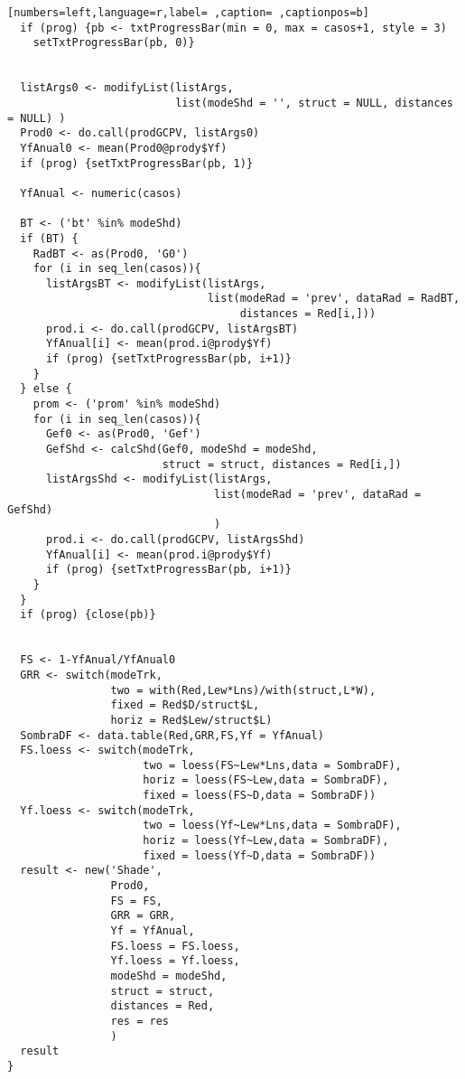 \begin{lstlisting}[numbers=left,language=r,label= ,caption= ,captionpos=b]
  if (prog) {pb <- txtProgressBar(min = 0, max = casos+1, style = 3)
    setTxtProgressBar(pb, 0)}
  
  
  listArgs0 <- modifyList(listArgs,
                          list(modeShd = '', struct = NULL, distances = NULL) )
  Prod0 <- do.call(prodGCPV, listArgs0)
  YfAnual0 <- mean(Prod0@prody$Yf) 
  if (prog) {setTxtProgressBar(pb, 1)}
  
  YfAnual <- numeric(casos) 
  
  BT <- ('bt' %in% modeShd)
  if (BT) { 
    RadBT <- as(Prod0, 'G0')
    for (i in seq_len(casos)){
      listArgsBT <- modifyList(listArgs,
                               list(modeRad = 'prev', dataRad = RadBT,
                                    distances = Red[i,]))
      prod.i <- do.call(prodGCPV, listArgsBT)
      YfAnual[i] <- mean(prod.i@prody$Yf)
      if (prog) {setTxtProgressBar(pb, i+1)}
    }
  } else {
    prom <- ('prom' %in% modeShd)
    for (i in seq_len(casos)){
      Gef0 <- as(Prod0, 'Gef')
      GefShd <- calcShd(Gef0, modeShd = modeShd,
                        struct = struct, distances = Red[i,])
      listArgsShd <- modifyList(listArgs,
                                list(modeRad = 'prev', dataRad = GefShd)
                                )
      prod.i <- do.call(prodGCPV, listArgsShd)
      YfAnual[i] <- mean(prod.i@prody$Yf)
      if (prog) {setTxtProgressBar(pb, i+1)}
    }
  }
  if (prog) {close(pb)}
  

  FS <- 1-YfAnual/YfAnual0
  GRR <- switch(modeTrk,
                two = with(Red,Lew*Lns)/with(struct,L*W),
                fixed = Red$D/struct$L,
                horiz = Red$Lew/struct$L)
  SombraDF <- data.table(Red,GRR,FS,Yf = YfAnual)
  FS.loess <- switch(modeTrk,
                     two = loess(FS~Lew*Lns,data = SombraDF),
                     horiz = loess(FS~Lew,data = SombraDF),
                     fixed = loess(FS~D,data = SombraDF))
  Yf.loess <- switch(modeTrk,
                     two = loess(Yf~Lew*Lns,data = SombraDF),
                     horiz = loess(Yf~Lew,data = SombraDF),
                     fixed = loess(Yf~D,data = SombraDF))
  result <- new('Shade',
                Prod0, 
                FS = FS,
                GRR = GRR,
                Yf = YfAnual,
                FS.loess = FS.loess,
                Yf.loess = Yf.loess,
                modeShd = modeShd,
                struct = struct,
                distances = Red,
                res = res
                )
  result
}
\end{lstlisting}
